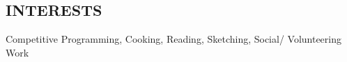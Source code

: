 \documentclass[margin]{res}
\begin{document}
\begin{resume}

\section{INTERESTS}
Competitive Programming, Cooking, Reading, Sketching, Social/ Volunteering Work

\end{resume}
\end{document}
